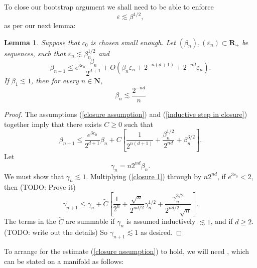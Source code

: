 \documentclass[reqno,10pt]{amsart}
\newcommand{\NN}{\mathbf{N}}
\newcommand{\RR}{\mathbf{R}}
\newtheorem{lemma}[theorem]{Lemma}
\theoremstyle{definition}
\numberwithin{equation}{section}
\begin{document}


To close our bootstrap argument we shall need to be able to enforce
\begin{equation}\label{closure assumption}
\varepsilon \lesssim \beta^{1/2},
\end{equation}
as per our next lemma:

\begin{lemma}
Suppose that $c_0$ is chosen small enough.
Let $(\beta_n), (\varepsilon_n) \subset \RR_+$ be sequences, such that $\varepsilon_n \lesssim \beta_n^{1/2}$ and 
\begin{equation}\label{inductive step in closure}
\beta_{n + 1} \leq e^{3c_0} \frac{\beta_n}{2^{d + 1}} + O(\beta_n \varepsilon_n + 2^{-n(d + 1)} + 2^{-nd} \varepsilon_n).
\end{equation}
If $\beta_1 \lesssim 1$, then for every $n \in \NN$,
\begin{equation}\label{closure completion}
\beta_n \lesssim \frac{2^{-nd}}{n}
\end{equation}
\end{lemma}
\begin{proof}
The assumptions (\ref{closure assumption}) and (\ref{inductive step in closure}) together imply that there exists $C \geq 0$ such that 
\begin{equation}\label{closure 1}
\beta_{n + 1} \leq \frac{e^{3c_0}}{2^{d + 1}} \beta_n + C \left[\frac{1}{2^{n(d + 1)}} + \frac{\beta_n^{1/2}}{2^{nd}} + \beta_n^{3/2}\right].
\end{equation}
Let
$$\gamma_n = n2^{nd} \beta_n.$$
We must show that $\gamma_n \lesssim 1$. Multiplying (\ref{closure 1}) through by $n2^{nd}$, if $e^{3c_0} < 2$, then (TODO: Prove it)
$$\gamma_{n + 1} \leq \gamma_n + \tilde C\left[\frac{1}{2^n} + \frac{\sqrt n}{2^{nd/2}} \gamma_n^{1/2} + \frac{\gamma_n^{3/2}}{2^{nd/2}\sqrt n}\right].$$
The terms in the $\tilde C$ are summable if $\gamma_n$ is assumed inductively $\lesssim 1$, and if $d \geq 2$. (TODO: write out the details)
So $\gamma_{n + 1} \lesssim 1$ as desired.
\end{proof}

To arrange for the estimate (\ref{closure assumption}) to hold, we will need \cite[Proposition 4.8]{Giusti77}, which can be stated on a manifold as follows:
\end{document}
